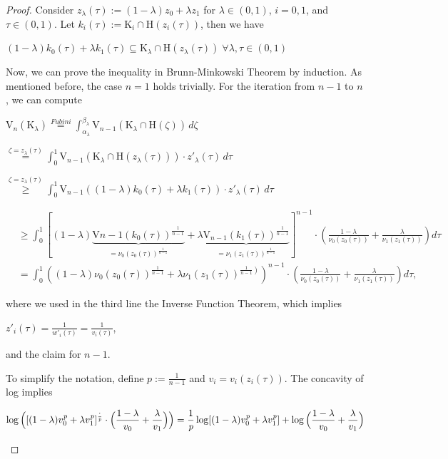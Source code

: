\documentclass[a4paper]{book}
\numberwithin{theorem}{section}%
\begin{document}
\begin{proof}
    Consider $z_{\lambda}(\tau):=(1-\lambda)z_{0}+\lambda z_{1}$ for $\lambda\in(0,1)$, $i=0,1$, and $\tau\in(0,1)$. Let $k_i(\tau):=\mathrm{K}_{i}\cap\mathrm{H}(z_i(\tau))$, then we have
    \begin{center}
        $\displaystyle (1-\lambda)k_{0}(\tau)+\lambda k_{1}(\tau)\subseteq\mathrm{K}_{\lambda}\cap\mathrm{H}(z_{\lambda}(\tau))\;\forall\lambda,\tau\in(0,1)$
    \end{center}
    Now, we can prove the inequality in Brunn-Minkowski Theorem by induction. As mentioned before, the case $n=1$ holds trivially. For the iteration from $n-1$ to $n$, we can compute
    \begin{center}
        $\displaystyle \mathrm{V}_{n}(\mathrm{K}_{\lambda})\overset{Fubini}{=}\int_{\alpha_{\lambda}}^{\beta_{\lambda}}\mathrm{V}_{n-1}(\mathrm{K}_{\lambda}\cap\mathrm{H}(\zeta))\,d\zeta$

        $\displaystyle \overset{\zeta=z_{\lambda}(\tau)}{=}\int_{0}^{1}\mathrm{V}_{n-1}(\mathrm{K}_{\lambda}\cap\mathrm{H}(z_{\lambda}(\tau)))\cdot z'_{\lambda}(\tau)\,d\tau$

        $\displaystyle \overset{\zeta=z_{\lambda}(\tau)}{\geq}\int_{0}^{1}\mathrm{V}_{n-1}((1-\lambda)k_{0}(\tau)+\lambda k_{1}(\tau))\cdot z'_{\lambda}(\tau)\,d\tau$

        $\displaystyle \begin{aligned} & \geq \int_0^1[(1-\lambda) \underbrace{\mathrm{V}{n-1}\left(k_0(\tau)\right)^{\frac{1}{n-1}}}_{=\nu_0\left(z_0(\tau)\right)^{\frac{1}{n-1}}}+\lambda \underbrace{\mathrm{V}_{n-1}\left(k_1(\tau)\right)^{\frac{1}{n-1}}}_{=\nu_1\left(z_1(\tau)\right)^{\frac{1}{n-1}}}]^{n-1} \cdot\left(\frac{1-\lambda}{\nu_0\left(z_0(\tau)\right)}+\frac{\lambda}{\nu_1\left(z_1(\tau)\right)}\right) d \tau \\ & =\int_0^1\left((1-\lambda) \nu_0\left(z_0(\tau)\right)^{\frac{1}{n-1}}+\lambda \nu_1\left(z_1(\tau)\right)^{\left.\frac{1}{n-1}\right)}\right)^{n-1} \cdot\left(\frac{1-\lambda}{\nu_0\left(z_0(\tau)\right)}+\frac{\lambda}{\nu_1\left(z_1(\tau)\right)}\right) d \tau,\end{aligned}$
    \end{center}
    where we used in the third line the Inverse Function Theorem, which implies
    \begin{center}
        $\displaystyle z'_{i}(\tau)=\frac{1}{w'_{i}(\tau)}=\frac{1}{v_{i}(\tau)}$,
    \end{center}
    and the claim for $n-1$.

    To simplify the notation, define $\mathit{p}:=\frac{1}{n-1}$ and $v_{i}=v_{i}(z_{i}(\tau))$. The concavity of log implies
    \begin{center}
        $\displaystyle \log\Big([(1-\lambda)v^{\mathit{p}}_{0}+\lambda v^{\mathit{p}}_{1}]^{\frac{`}{\mathit{p}}}\cdot\Big(\frac{1-\lambda}{v_{0}}+\frac{\lambda}{v_{1}}\Big)\Big)=\frac{1}{\mathit{p}}\log[(1-\lambda)v^{\mathit{p}}_{0}+\lambda v^{\mathit{p}}_{1}]+\log\Big(\frac{1-\lambda}{v_{0}}+\frac{\lambda}{v_{1}}\Big)$


\end{center}
\end{proof}
\end{document}
